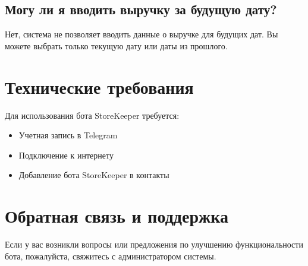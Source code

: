 \documentclass[a4paper,12pt]{article}
\begin{document}
\subsection{Могу ли я вводить выручку за будущую дату?}
Нет, система не позволяет вводить данные о выручке для будущих дат. Вы можете выбрать только текущую дату или даты из прошлого.

\section{Технические требования}

Для использования бота StoreKeeper требуется:
\begin{itemize}
    \item Учетная запись в Telegram
    \item Подключение к интернету
    \item Добавление бота StoreKeeper в контакты
\end{itemize}

\section{Обратная связь и поддержка}

Если у вас возникли вопросы или предложения по улучшению функциональности бота, пожалуйста, свяжитесь с администратором системы.
\end{document}

